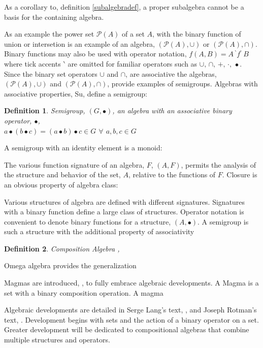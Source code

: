 \documentclass[aps,twocolumn,secnumarabic,nobalancelastpage,amsmath,amssymb,
amsthm,nofootinbib,parskip=full]{revtex4}
\newtheorem{definition}{Definition}[section]
\begin{document}
As a corollary to, definition \ref{subalgebradef}, a proper subalgebra
cannot be a basis for the containing algebra.

As an example the power set $\mathcal{P}(A)$ of a set $A$,
with the binary function of union or intersetion
is an example of an algebra, $(\mathcal{P}(A),\cup)$
or $(\mathcal{P}(A),\cap)$. Binary functions may also
be used with operator notation, $f(A,B)=A\,{}^\backprime f{}^\backprime \,B$ where
tick accents $\backprime$ are omitted for familiar operators such as
$\cup,\,\cap,\,+,\,\cdot,\,\bullet$. Since the
binary set operators $\cup$ and $\cap$, are associative the algebras,
$(\mathcal{P}(A),\cup)$ and $(\mathcal{P}(A),\cap)$, provide
examples of semigroups. Algebras with
associative properties, Su, define a semigroup:

\begin{definition}{Semigroup, $(G,\bullet)$}\label{semigroup},
  an algebra with an associative binary operator, $\bullet$, \\
  $a\bullet (b\bullet c) = (a\bullet b)\bullet c\in G$ $\forall$ $a,b,c\in G$
\end{definition}

A semigroup with an identity element is a monoid:



The various function signature of an algebra, $F$, $(A,F)$,
permits the analysis of the structure and behavior
of the set, $A$, relative to the functions of $F$.
Closure is an obvious property of algebra class:



Various structures of algebra are defined with different
signatures. Signatures with a binary function define
a large class of structures. Operator notation
is convenient to denote binary functions for a
structure, $(A,\bullet)$. A semigroup is
such a structure with the additional property
of associativity 



\begin{definition}{Composition Algebra },
  
\end{definition}

Omega algebra provides the generalization

Magmas are introduced, \cite{borbaki1989}, to fully embrace
algebraic developments. A Magma is a
set with a binary composition operation. A magma




Algebraic developments are detailed in Serge Lang's text, 
\cite{lang2002}, and Joseph Rotman's text, \cite{rotman1998}. 
Development begins with sets and the action of a binary operator on a set.
Greater development will be dedicated to compositional algebras that
combine multiple structures and operators.
\end{document}

